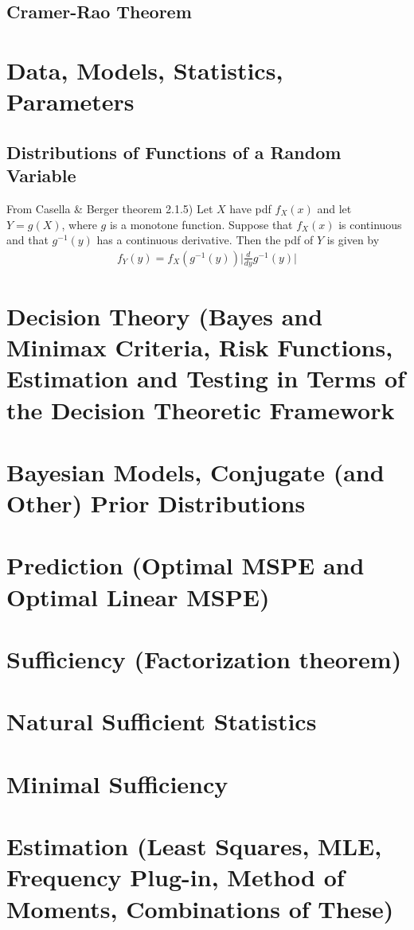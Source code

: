 \documentclass{memoir}
\begin{document}
\section{Cramer-Rao Theorem}

\chapter{Data, Models, Statistics, Parameters}
\section{Distributions of Functions of a Random Variable}
\begin{thm}
	From Casella \& Berger theorem 2.1.5) Let $X$ have pdf $f_X(x)$ and let $Y=g(X)$, where $g$ is a monotone function. Suppose that $f_X(x)$ is continuous and that $g^{-1}(y)$ has a continuous derivative. Then the pdf of $Y$ is given by
	\begin{align}
		f_Y(y) = f_X(g^{-1}(y)) \Big|\frac{d}{dy} g^{-1}(y)\Big|
	\end{align}
\end{thm}

\chapter{Decision Theory (Bayes and Minimax Criteria, Risk Functions, Estimation and Testing in Terms of the Decision Theoretic Framework}
\chapter{Bayesian Models, Conjugate (and Other) Prior Distributions}
\chapter{Prediction (Optimal MSPE and Optimal Linear MSPE)}
\chapter{Sufficiency (Factorization theorem)}
\chapter{Natural Sufficient Statistics}
\chapter{Minimal Sufficiency}
\chapter{Estimation (Least Squares, MLE, Frequency Plug-in, Method of Moments, Combinations of These)}
\end{document}
